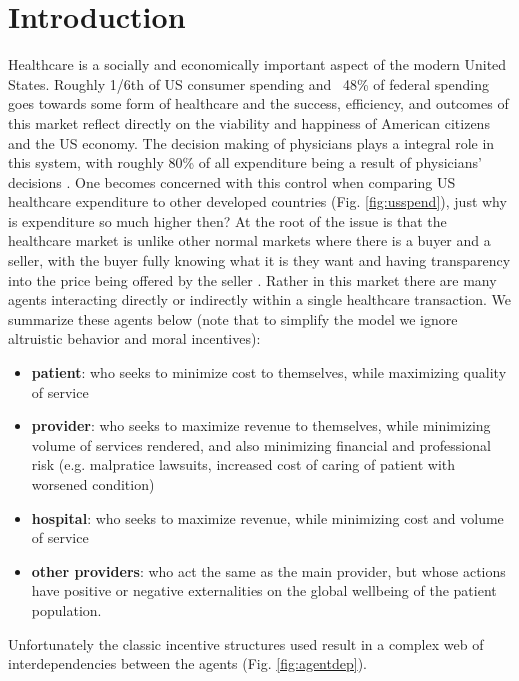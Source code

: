 \documentclass[a4paper]{llncs}
\begin{document}
\section*{Introduction}

Healthcare is a socially and economically important aspect of the modern United States. Roughly 1/6th of US consumer spending \cite{econharvard} and ~48\% of federal spending \cite{federalspend} goes towards some form of healthcare and the success, efficiency, and outcomes of this market reflect directly on the viability and happiness of American citizens and the US economy. The decision making of physicians plays a integral role in this system, with roughly 80\% of all expenditure being a result of physicians' decisions \cite{trust}. One becomes concerned with this control when comparing US healthcare expenditure to other developed countries (Fig. \ref{fig:usspend}), just why is expenditure so much higher then? At the root of the issue is that the healthcare market is unlike other normal markets where there is a buyer and a seller, with the buyer fully knowing what it is they want and having transparency into the price being offered by the seller \cite{msdt}. Rather in this market there are many agents interacting directly or indirectly within a single healthcare transaction. We summarize these agents below (note that to simplify the model we ignore altruistic behavior and moral incentives):

\begin{itemize}
    \item \textbf{patient}: who seeks to minimize cost to themselves, while maximizing quality of service
    \item \textbf{provider}: who seeks to maximize revenue to themselves, while minimizing volume of services rendered, and also minimizing financial and professional risk (e.g. malpratice lawsuits, increased cost of caring of patient with worsened condition)
    \item \textbf{hospital}: who seeks to maximize revenue, while minimizing cost and volume of service
    \item \textbf{other providers}: who act the same as the main provider, but whose actions have positive or negative externalities on the global wellbeing of the patient population.
\end{itemize}

Unfortunately the classic incentive structures used result in a complex web of interdependencies between the agents (Fig. \ref{fig:agentdep}).
\end{document}
